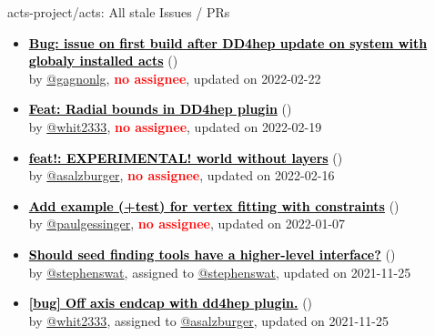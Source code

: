 \begin{frame}[allowframebreaks]{ acts-project/acts: All stale Issues / PRs}
\begin{itemize}
    \item\iss\prstale\textbf{\href{https://github.com/acts-project/acts/issues/1139}{\textcolor{black}{Bug: issue on first build after DD4hep update on system with globaly installed acts}}}
    (\href{https://github.com/acts-project/acts/issues/1139}{}) \\
    by \href{https://github.com/gagnonlg}{@gagnonlg}, {}\textbf{\textcolor{Red}{no assignee}}, updated on 2022-02-22

    \item\iss\prstale\textbf{\href{https://github.com/acts-project/acts/issues/822}{\textcolor{black}{Feat: Radial bounds in DD4hep plugin}}}
    (\href{https://github.com/acts-project/acts/issues/822}{}) \\
    by \href{https://github.com/whit2333}{@whit2333}, {}\textbf{\textcolor{Red}{no assignee}}, updated on 2022-02-19

    \item\propen\prwip\prstale\textbf{\href{https://github.com/acts-project/acts/pull/1039}{\textcolor{black}{feat!: EXPERIMENTAL! world without layers}}}
    (\href{https://github.com/acts-project/acts/pull/1039}{}) \\
    by \href{https://github.com/asalzburger}{@asalzburger}, {}\textbf{\textcolor{Red}{no assignee}}, updated on 2022-02-16

    \item\iss\prstale\textbf{\href{https://github.com/acts-project/acts/issues/1100}{\textcolor{black}{Add example (+test) for vertex fitting with constraints}}}
    (\href{https://github.com/acts-project/acts/issues/1100}{}) \\
    by \href{https://github.com/paulgessinger}{@paulgessinger}, {}\textbf{\textcolor{Red}{no assignee}}, updated on 2022-01-07

    \item\iss\prstale\textbf{\href{https://github.com/acts-project/acts/issues/988}{\textcolor{black}{Should seed finding tools have a higher-level interface?}}}
    (\href{https://github.com/acts-project/acts/issues/988}{}) \\
    by \href{https://github.com/stephenswat}{@stephenswat}, {}assigned to \href{https://github.com/stephenswat}{@stephenswat}, updated on 2021-11-25

    \item\iss\prstale\textbf{\href{https://github.com/acts-project/acts/issues/942}{\textcolor{black}{[bug] Off axis endcap with dd4hep plugin.}}}
    (\href{https://github.com/acts-project/acts/issues/942}{}) \\
    by \href{https://github.com/whit2333}{@whit2333}, {}assigned to \href{https://github.com/asalzburger}{@asalzburger}, updated on 2021-11-25


\end{itemize}
\end{frame}
